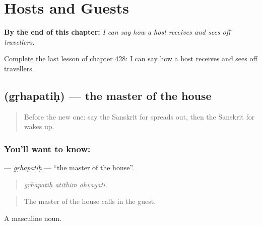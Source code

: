 
\chapter{Hosts and Guests}
\label{ch:sa-hosts-and-guests}

\begin{chapteropening}
\textbf{By the end of this chapter:} \emph{I can say how a host receives and sees off travellers.}

Complete the last lesson of chapter 428: I can say how a host receives and sees off travellers.
\end{chapteropening}

\section[\texorpdfstring{\sk{गृहपतिः} (gṛhapatiḥ)}{गृहपतिः (gṛhapatiḥ)}]{ (gṛhapatiḥ) — the master of the house}

\label{lesson:SA-C428-grhapatih}



\begin{quote}
Before the new one: say the Sanskrit for spreads out, then the Sanskrit for wakes up.
\end{quote}

\subsection*{You'll want to know: }
\textbf{} — \emph{gṛhapatiḥ} — \textquotedblleft{}the master of the house\textquotedblright{}.

\begin{quote}
  
\end{quote}

\begin{quote}
\emph{gṛhapatiḥ atithim āhvayati.}
\end{quote}

\begin{quote}
The master of the house calls in the guest.
\end{quote}

A masculine noun.

